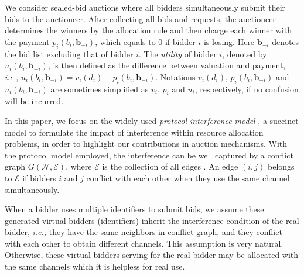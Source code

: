 \documentclass{sig-alternate}
\begin{document}
We consider sealed-bid auctions where all bidders simultaneously submit their bids to the auctioneer. After collecting all bids and requests, the auctioneer determines the winners by the allocation rule and then charge each winner with the payment $p_i(b_i,\mathbf{b}_{-i})$, which equals to 0 if bidder $i$ is losing. Here $\mathbf{b}_{-i}$ denotes the bid list excluding that of bidder $i$. The \emph{utility} of bidder $i$, denoted by $u_i(b_i, \mathbf{b}_{-i})$, is then defined as the difference between valuation and payment, \textit{i.e.}, $u_i(b_i, \mathbf{b}_{-i})=v_i(d_i)-p_i(b_i,\mathbf{b}_{-i})$. Notations $v_i(d_i)$, $p_i(b_i, \mathbf{b}_{-i})$ and $u_i(b_i, \mathbf{b}_{-i})$ are sometimes simplified as $v_i$, $p_i$ and $u_i$, respectively, if no confusion will be incurred.




In this paper, we focus on the widely-used \emph{protocol interference model} \cite{Gupta:00, Mobicom03:Jain}, a succinct model to formulate the impact of interference within resource allocation problems, in order to highlight our contributions in auction mechanisms. With the protocol model employed, the interference can be well captured by a conflict graph $G(\mathcal{N}, \mathcal{E})$, where $\mathcal{E}$ is the collection of all edges \cite{Mobicom03:Jain}. An edge $(i,j)$ belongs to $\mathcal{E}$ if bidders $i$ and $j$ conflict with each other when they use the same channel simultaneously.

When a bidder uses multiple identifiers to submit bids, we assume these generated virtual bidders (identifiers) inherit the interference condition of the real bidder, \emph{i.e.,} they have the same neighbors in conflict graph, and they conflict with each other to obtain different channels. This assumption is very natural. Otherwise, these virtual bidders serving for the real bidder may be allocated with the same channels which it is helpless for real use.

\end{document}
